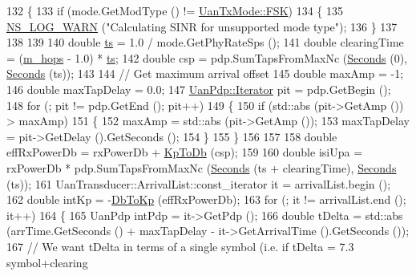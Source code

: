 \begin{DoxyCode}
132 \{
133   \textcolor{keywordflow}{if} (mode.GetModType () != \hyperlink{classns3_1_1UanTxMode_a0e822d222c13aa9499c96d9b3ad21223aed210294b6a9642f3f027ccb74cdf7b6}{UanTxMode::FSK})
134     \{
135       \hyperlink{group__logging_gade7208b4009cdf0e25783cd26766f559}{NS\_LOG\_WARN} (\textcolor{stringliteral}{"Calculating SINR for unsupported mode type"});
136     \}
137 
138 
139 
140   \textcolor{keywordtype}{double} \hyperlink{lte_2model_2fading-traces_2fading__trace__generator_8m_ada841f58d7be618bfbc76c87e7d44086}{ts} = 1.0 / mode.GetPhyRateSps ();
141   \textcolor{keywordtype}{double} clearingTime = (\hyperlink{classns3_1_1UanPhyCalcSinrFhFsk_ad3f404c81ac8fcc8987c991b51ecb717}{m\_hops} - 1.0) * \hyperlink{lte_2model_2fading-traces_2fading__trace__generator_8m_ada841f58d7be618bfbc76c87e7d44086}{ts};
142   \textcolor{keywordtype}{double} csp = pdp.SumTapsFromMaxNc (\hyperlink{group__timecivil_ga33c34b816f8ff6628e33d5c8e9713b9e}{Seconds} (0), \hyperlink{group__timecivil_ga33c34b816f8ff6628e33d5c8e9713b9e}{Seconds} (ts));
143 
144   \textcolor{comment}{// Get maximum arrival offset}
145   \textcolor{keywordtype}{double} maxAmp = -1;
146   \textcolor{keywordtype}{double} maxTapDelay = 0.0;
147   \hyperlink{classns3_1_1UanPdp_a640e546e31696f75f9e638513b38ceba}{UanPdp::Iterator} pit = pdp.GetBegin ();
148   \textcolor{keywordflow}{for} (; pit != pdp.GetEnd (); pit++)
149     \{
150       \textcolor{keywordflow}{if} (std::abs (pit->GetAmp ()) > maxAmp)
151         \{
152           maxAmp = std::abs (pit->GetAmp ());
153           maxTapDelay = pit->GetDelay ().GetSeconds ();
154         \}
155     \}
156 
157 
158   \textcolor{keywordtype}{double} effRxPowerDb = rxPowerDb + \hyperlink{classns3_1_1UanPhyCalcSinr_a5f57a07d4f7e8e457a4c6fb946b9ec96}{KpToDb} (csp);
159 
160   \textcolor{keywordtype}{double} isiUpa = rxPowerDb * pdp.SumTapsFromMaxNc (\hyperlink{group__timecivil_ga33c34b816f8ff6628e33d5c8e9713b9e}{Seconds} (ts + clearingTime), 
      \hyperlink{group__timecivil_ga33c34b816f8ff6628e33d5c8e9713b9e}{Seconds} (ts));
161   UanTransducer::ArrivalList::const\_iterator it = arrivalList.begin ();
162   \textcolor{keywordtype}{double} intKp = -\hyperlink{classns3_1_1UanPhyCalcSinr_a7af4e8735a93dabeef93d929fe166d27}{DbToKp} (effRxPowerDb);
163   \textcolor{keywordflow}{for} (; it != arrivalList.end (); it++)
164     \{
165       UanPdp intPdp = it->GetPdp ();
166       \textcolor{keywordtype}{double} tDelta = std::abs (arrTime.GetSeconds () + maxTapDelay - it->GetArrivalTime ().GetSeconds ());
167       \textcolor{comment}{// We want tDelta in terms of a single symbol (i.e. if tDelta = 7.3 symbol+clearing}

\end{DoxyCode}
